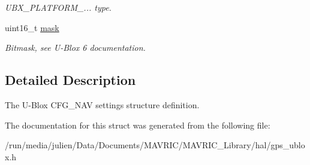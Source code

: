 \begin{DoxyCompactItemize}
\begin{DoxyCompactList}\small\item\em U\+B\+X\+\_\+\+P\+L\+A\+T\+F\+O\+R\+M\+\_\+... type. \end{DoxyCompactList}\item 
\hypertarget{structubx__cfg__nav__settings__t_a7affa443e519b735a2bac1197a6b67f1}{uint16\+\_\+t \hyperlink{structubx__cfg__nav__settings__t_a7affa443e519b735a2bac1197a6b67f1}{mask}}\label{structubx__cfg__nav__settings__t_a7affa443e519b735a2bac1197a6b67f1}

\begin{DoxyCompactList}\small\item\em Bitmask, see U-\/\+Blox 6 documentation. \end{DoxyCompactList}\end{DoxyCompactItemize}


\subsection{Detailed Description}
The U-\/\+Blox C\+F\+G\+\_\+\+N\+A\+V settings structure definition. 

The documentation for this struct was generated from the following file\+:\begin{DoxyCompactItemize}
\item 
/run/media/julien/\+Data/\+Documents/\+M\+A\+V\+R\+I\+C/\+M\+A\+V\+R\+I\+C\+\_\+\+Library/hal/gps\+\_\+ublox.\+h\end{DoxyCompactItemize}
